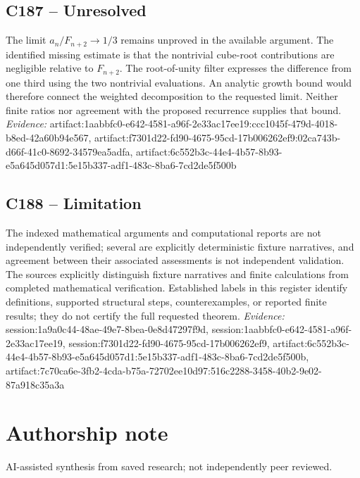 \documentclass[11pt]{article}
\begin{document}
\subsection{C187 -- Unresolved}
The limit $a_n/F_{n+2}\to1/3$ remains unproved in the available argument. The identified missing estimate is that the nontrivial cube-root contributions are negligible relative to $F_{n+2}$.
The root-of-unity filter expresses the difference from one third using the two nontrivial evaluations. An analytic growth bound would therefore connect the weighted decomposition to the requested limit. Neither finite ratios nor agreement with the proposed recurrence supplies that bound.
\textit{Evidence: }artifact:1aabbfc0-e642-4581-a96f-2e33ac17ee19:ccc1045f-479d-4018-b8ed-42a60b94e567, artifact:f7301d22-fd90-4675-95cd-17b006262ef9:02ca743b-d66f-41c0-8692-34579ea5adfa, artifact:6c552b3c-44e4-4b57-8b93-e5a645d057d1:5e15b337-adf1-483c-8ba6-7cd2de5f500b
\subsection{C188 -- Limitation}
The indexed mathematical arguments and computational reports are not independently verified; several are explicitly deterministic fixture narratives, and agreement between their associated assessments is not independent validation.
The sources explicitly distinguish fixture narratives and finite calculations from completed mathematical verification. Established labels in this register identify definitions, supported structural steps, counterexamples, or reported finite results; they do not certify the full requested theorem.
\textit{Evidence: }session:1a9a0c44-48ae-49e7-8bea-0e8d47297f9d, session:1aabbfc0-e642-4581-a96f-2e33ac17ee19, session:f7301d22-fd90-4675-95cd-17b006262ef9, artifact:6c552b3c-44e4-4b57-8b93-e5a645d057d1:5e15b337-adf1-483c-8ba6-7cd2de5f500b, artifact:7c70ca6e-3fb2-4cda-b75a-72702ee10d97:516c2288-3458-40b2-9e02-87a918c35a3a
\section*{Authorship note}
AI-assisted synthesis from saved research; not independently peer reviewed.
\end{document}
